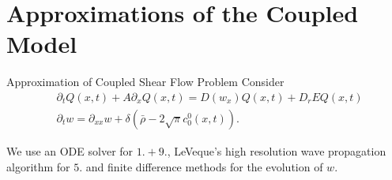 \section{Approximations of the Coupled Model}
\begin{frame}{Approximation of Coupled Shear Flow Problem}
	\scriptsize
	Consider
	\begin{equation}
		\begin{split}
			&\partial_t Q(x,t) + A\partial_x Q(x,t) =  D(w_x)Q(x,t)+ D_rEQ(x,t) \\
			&\partial_{t}w = \partial_{xx}w + \delta(\bar{\rho}-2\sqrt{\pi} c^0_0(x,t)).
		\end{split}
		\label{coupledsys_1d}
	\end{equation}
	\begin{table}[h]
		\centering
		\renewcommand{\arraystretch}{1.3}
		\caption{Splitting algorithm for solving the coupled shear flow problem (Dahm et al.)}
	\end{table}
	We use an ODE solver for $1.+9.$, LeVeque’s high resolution wave propagation algorithm for $5.$ and finite difference methods for the evolution of $w$.
\end{frame}


